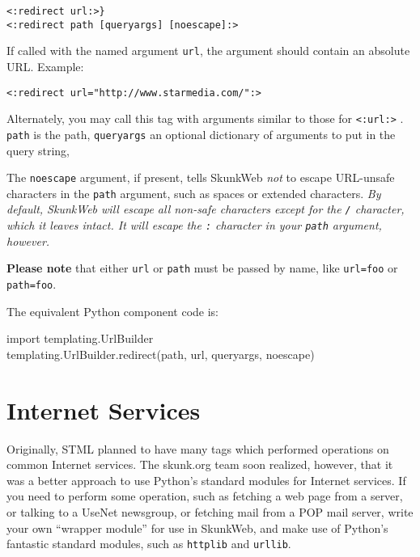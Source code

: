 \documentclass{manual}
\begin{document}
{{\begin{verbatim}
<:redirect url:>}
<:redirect path [queryargs] [noescape]:>
\end{verbatim}

If called with the named argument \texttt{url}, the argument
should contain an absolute URL. Example:

\begin{verbatim}<:redirect url="http://www.starmedia.com/":>\end{verbatim}

Alternately, you may call this tag with arguments
similar to those for 
\texttt{<:url:>} . 
\texttt{path} is the path, \texttt{queryargs} an optional
dictionary of arguments to put in the query string,


The \texttt{noescape} argument, if present,
tells SkunkWeb \emph{not} to escape URL-unsafe characters in the \texttt{path}
argument, such as spaces or extended characters. \emph{By default,
SkunkWeb will escape all non-safe characters except for the \texttt{/}
character, which it leaves intact. It will escape the \texttt{:}
character in your \texttt{path} argument, however.}


\textbf{Please note} that either \texttt{url} or \texttt{path}
must be passed by name, like \texttt{url=foo} or 
\texttt{path=foo}.



The equivalent Python component code is: 
\begin{obeylines}\ttfamily
import templating.UrlBuilder
templating.UrlBuilder.redirect(path, url, queryargs, noescape)
\end{obeylines}



\chapter{Internet Services}
\label{stmlrefnet}
Originally, STML planned to have many tags
which performed operations on common Internet services.
The skunk.org team soon realized, however, that
it was a better approach to use Python's standard
modules for Internet services. If you need to perform
some operation, such as fetching a web page from a server,
or talking to a UseNet newsgroup, or fetching mail
from a POP mail server, write your own ``wrapper module''
for use in SkunkWeb, and make use of Python's fantastic
standard modules, such as \texttt{httplib} and
\texttt{urllib}.

}}
\end{document}

